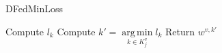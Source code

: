 \documentclass[conference]{IEEEtran}
\DeclareMathOperator*{\argmin}{arg\,min}
\begin{document}
\begin{algorithm}[!htb]
\caption{DFedMinLoss }
\begin{algorithmic}
\small
{}
\label{mergFedBest}
\State Compute $l_k$  
\EndFor
\State Compute $k'=\argmin\limits_{k\in K^{v}_j} l_k$
\State Return $w^{v,k'}$
\EndFunction
\end{algorithmic}
\normalsize
\end{algorithm}
%




%
%
%




\vspace{-12pt}


\cleardoublepage


\end{document}
